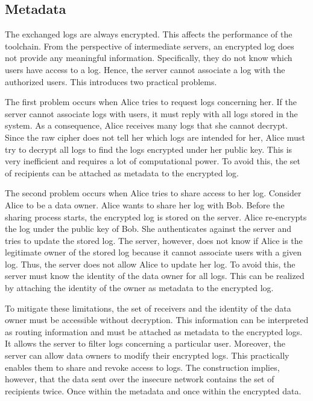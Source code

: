 \documentclass[../main.tex]{subfiles}
\begin{document}
\subsection{Metadata}
\label{sec:metadata}
The exchanged logs are always encrypted.
This affects the performance of the toolchain.
From the perspective of intermediate servers, an encrypted log does not provide any meaningful information.
Specifically, they do not know which users have access to a log.
Hence, the server cannot associate a log with the authorized users.
This introduces two practical problems.

The first problem occurs when Alice tries to request logs concerning her.
If the server cannot associate logs with users, it must reply with all logs stored in the system.
As a consequence, Alice receives many logs that she cannot decrypt.
Since the raw cipher does not tell her which logs are intended for her, Alice must try to decrypt all logs to find the logs encrypted under her public key.
This is very inefficient and requires a lot of computational power.
To avoid this, the set of recipients can be attached as metadata to the encrypted log.

The second problem occurs when Alice tries to share access to her log.
Consider Alice to be a data owner.
Alice wants to share her log with Bob.
Before the sharing process starts, the encrypted log is stored on the server.
Alice re-encrypts the log under the public key of Bob.
She authenticates against the server and tries to update the stored log.
The server, however, does not know if Alice is the legitimate owner of the stored log because it cannot associate users with a given log.
Thus, the server does not allow Alice to update her log.
To avoid this, the server must know the identity of the data owner for all logs.
This can be realized by attaching the identity of the owner as metadata to the encrypted log.

To mitigate these limitations, the set of receivers and the identity of the data owner must be accessible without decryption.
This information can be interpreted as routing information and must be attached as metadata to the encrypted logs.
It allows the server to filter logs concerning a particular user.
Moreover, the server can allow data owners to modify their encrypted logs.
This practically enables them to share and revoke access to logs.
The construction implies, however, that the data sent over the insecure network contains the set of recipients twice.
Once within the metadata and once within the encrypted data.
\end{document}
